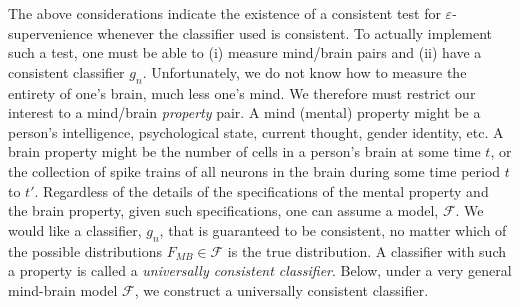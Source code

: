 \documentclass{article}
\newcommand{\conv}{\rightarrow}
\newcommand{\eps}{\varepsilon}
\providecommand{\mc}[1]{\mathcal{#1}}
\newcommand{\hL}{\widehat{L}}
\begin{document}
The above considerations indicate the existence of a consistent test for $\eps$-supervenience whenever the classifier used is consistent.  
To actually implement such a test, one must be able to (i) measure mind/brain pairs and (ii) have a consistent classifier $g_n$.  Unfortunately, we do not know how to measure the entirety of one's brain, much less one's mind. 
We therefore must restrict our interest to a mind/brain \emph{property} pair.  
A mind (mental) property might be a person's intelligence, psychological state, current thought, gender identity, etc.  A brain property might be the number of cells in a person's brain at some time $t$, or the collection of spike trains of all neurons in the brain during some time period $t$ to $t'$.  Regardless of the details of the specifications of the mental property and the brain property, given such specifications, one can assume a model, $\mc{F}$.  We would like a classifier, $g_n$, that is guaranteed to be consistent, no matter which of the possible distributions $F_{MB} \in \mc{F}$ is the true distribution.  A classifier with such a property is called a \emph{universally consistent classifier}.  
Below, under a very general mind-brain model $\mc{F}$, we construct a universally consistent classifier. 


\end{document}
